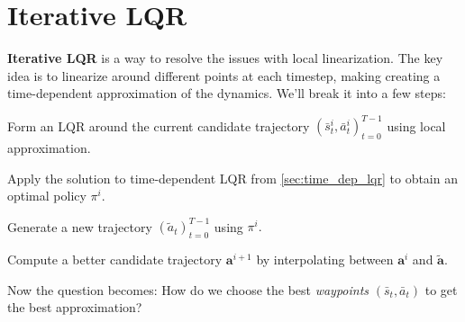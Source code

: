 \documentclass[../main/main]{subfiles}
\begin{document}
\section{Iterative LQR}

\textbf{Iterative LQR} is a way to resolve the issues with local linearization.
The key idea is to linearize around different points at each timestep, making creating a time-dependent approximation of the dynamics.
We'll break it into a few steps:
\begin{steps}
    \item Form an LQR around the current candidate trajectory $(\bar s^i_t, \bar a^i_t)_{t=0}^{T-1}$ using local approximation.
    \item Apply the solution to time-dependent LQR from \autoref{sec:time_dep_lqr} to obtain an optimal policy $\pi^i.$
    \item Generate a new trajectory $(\tilde a_t)_{t=0}^{T-1}$ using $\pi^i.$
    \item Compute a better candidate trajectory $\mathbf{a}^{i+1}$ by interpolating between $\mathbf{a}^i$ and $\tilde {\mathbf{a}}.$
\end{steps}
Now the question becomes: How do we choose the best \emph{waypoints} $(\bar s_t, \bar a_t)$ to get the best approximation?
\end{document}
